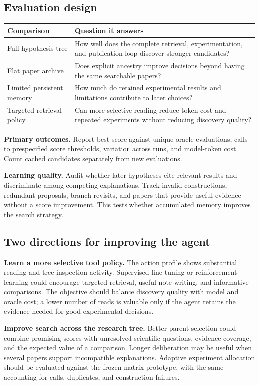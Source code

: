\documentclass[11pt,a4paper]{article}
\begin{document}
\subsection*{Evaluation design}
\begin{tabularx}{\linewidth}{@{}p{.29\linewidth}X@{}}
\toprule
\textbf{Comparison} & \textbf{Question it answers}\\
\midrule
Full hypothesis tree & How well does the complete retrieval, experimentation, and publication loop discover stronger candidates?\\[5pt]
Flat paper archive & Does explicit ancestry improve decisions beyond having the same searchable papers?\\[5pt]
Limited persistent memory & How much do retained experimental results and limitations contribute to later choices?\\[5pt]
Targeted retrieval policy & Can more selective reading reduce token cost and repeated experiments without reducing discovery quality?\\
\bottomrule
\end{tabularx}

\textbf{Primary outcomes.} Report best score against unique oracle evaluations, calls to prespecified score thresholds, variation across runs, and model-token cost. Count cached candidates separately from new evaluations.

\textbf{Learning quality.} Audit whether later hypotheses cite relevant results and discriminate among competing explanations. Track invalid constructions, redundant proposals, branch revisits, and papers that provide useful evidence without a score improvement. This tests whether accumulated memory improves the search strategy.

\subsection*{Two directions for improving the agent}
\textbf{Learn a more selective tool policy.} The action profile shows substantial reading and tree-inspection activity. Supervised fine-tuning or reinforcement learning could encourage targeted retrieval, useful note writing, and informative comparisons. The objective should balance discovery quality with model and oracle cost; a lower number of reads is valuable only if the agent retains the evidence needed for good experimental decisions.

\textbf{Improve search across the research tree.} Better parent selection could combine promising scores with unresolved scientific questions, evidence coverage, and the expected value of a comparison. Longer deliberation may be useful when several papers support incompatible explanations. Adaptive experiment allocation should be evaluated against the frozen-matrix prototype, with the same accounting for calls, duplicates, and construction failures.
\end{document}
